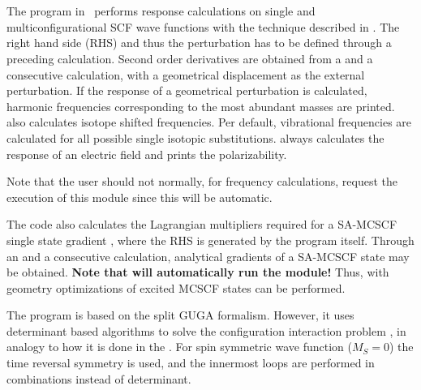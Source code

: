 
\section{}
\label{UG:sec:mclr}

The  program in \molcas\ performs response calculations on
single and multiconfigurational SCF wave functions with the technique described
in \cite{Bernhardsson:99a}.
The right hand side (RHS) and thus the perturbation has to be defined through a preceding
 calculation. Second order derivatives are obtained from a  and
a consecutive  calculation, with a geometrical displacement as the external perturbation.
If the response of a geometrical perturbation is calculated, harmonic frequencies corresponding to
the most abundant masses are printed.  also calculates isotope shifted frequencies.
Per default, vibrational frequencies are calculated for all possible single isotopic substitutions.
 always calculates the response of an electric field and prints the polarizability.

Note that the user should not normally, for frequency calculations,
request the execution of this module since this will be automatic.

The  code also calculates the Lagrangian multipliers required for a
SA-MCSCF single state gradient \cite{Stalring:01a}, where the RHS is generated by the program itself.
Through an  and a consecutive  calculation, analytical gradients
of a SA-MCSCF state may be obtained. {\bf Note that  will automatically run the  module!}
Thus, with  geometry optimizations of
excited MCSCF states can be performed.

The  program is based on the split GUGA formalism.
However, it uses determinant based algorithms to solve the configuration
interaction problem \cite{rasdet}, in analogy to how it is done in the  .
For spin symmetric wave function ($M_S=0$) the time reversal symmetry is used, and the innermost loops are performed in
combinations instead of determinant.

